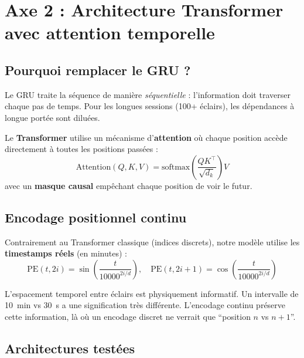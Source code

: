 \documentclass[11pt,a4paper]{article}
\newenvironment{keybox}[1]
  {\begin{tcolorbox}[colback=meteoGray,colframe=meteoBlue,title={\textbf{#1}},
    fonttitle=\small, boxrule=0.6pt, arc=3pt]}
  {\end{tcolorbox}}
\begin{document}
\section{Axe 2 : Architecture Transformer avec attention temporelle}

\subsection{Pourquoi remplacer le GRU ?}

Le GRU traite la séquence de manière \emph{séquentielle} : l'information doit traverser chaque pas de temps. Pour les longues sessions (100+ éclairs), les dépendances à longue portée sont diluées.

Le \textbf{Transformer} utilise un mécanisme d'\textbf{attention} où chaque position accède directement à toutes les positions passées :
\begin{equation}
\text{Attention}(Q, K, V) = \text{softmax}\left(\frac{QK^\top}{\sqrt{d_k}}\right) V
\end{equation}
avec un \textbf{masque causal} empêchant chaque position de voir le futur.

\subsection{Encodage positionnel continu}

Contrairement au Transformer classique (indices discrets), notre modèle utilise les \textbf{timestamps réels} (en minutes) :
\begin{equation}
\text{PE}(t, 2i) = \sin\left(\frac{t}{10000^{2i/d}}\right), \quad \text{PE}(t, 2i+1) = \cos\left(\frac{t}{10000^{2i/d}}\right)
\end{equation}

\begin{keybox}{Pourquoi l'encodage continu ?}
L'espacement temporel entre éclairs est physiquement informatif. Un intervalle de 10~min vs 30~s a une signification très différente. L'encodage continu préserve cette information, là où un encodage discret ne verrait que ``position $n$ vs $n+1$''.
\end{keybox}

\subsection{Architectures testées}
\end{document}
